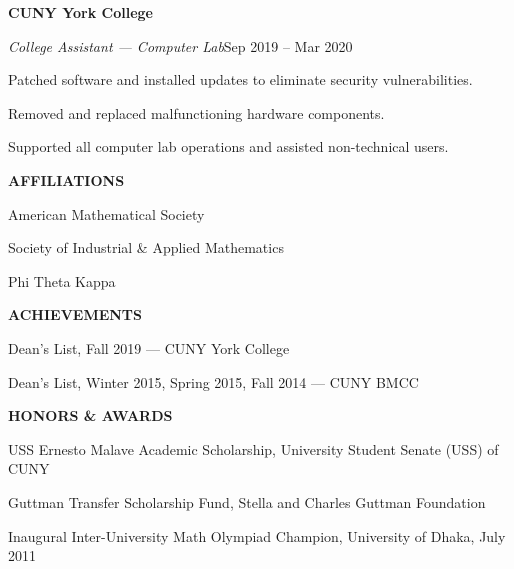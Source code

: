 \documentclass[a4paper, 12pt]{article}
\newcommand{\workplace}[1]{%
  \noindent\textbf{#1}\par
}
\newcommand{\workrole}[2]{%
  \noindent\hspace*{1em}\textit{#1}\hfill #2\par
}
\newcommand{\workunit}[1]{%
  \noindent\hspace*{1em}{\small\itshape #1}\par
}
\begin{document}
\begin{flushleft}
\noindent\begin{minipage}{\linewidth}
\workplace{CUNY York College}
\workrole{College Assistant --- Computer Lab}{Sep 2019 -- Mar 2020}
\workunit{Department of Mathematics \& Computer Science}
\begin{compactitem}
    \item Patched software and installed updates to eliminate security vulnerabilities.
    \item Removed and replaced malfunctioning hardware components.
    \item Supported all computer lab operations and assisted non-technical users.
\end{compactitem}
\end{minipage}

\end{flushleft}

\noindent\begin{minipage}{\linewidth}
\begin{flushleft}
\faUser\quad\textbf{AFFILIATIONS}
\begin{compactitem}
    \item American Mathematical Society
    \item Society of Industrial \& Applied Mathematics
    \item Phi Theta Kappa
\end{compactitem}
\end{flushleft}
\end{minipage}

\begin{flushleft}
\faTrophy\quad\textbf{ACHIEVEMENTS}
\begin{compactitem}
    \item Dean's List, Fall 2019 --- CUNY York College
    \item Dean's List, Winter 2015, Spring 2015, Fall 2014 --- CUNY BMCC
\end{compactitem}
\end{flushleft}

\noindent\begin{minipage}{\linewidth}
\begin{flushleft}
\faAward\quad\textbf{HONORS \& AWARDS}
\begin{compactitem}
    \item USS Ernesto Malave Academic Scholarship, University Student Senate (USS) of CUNY
    \item Guttman Transfer Scholarship Fund, Stella and Charles Guttman Foundation
    \item Inaugural Inter-University Math Olympiad Champion, University of Dhaka, July 2011
\end{compactitem}
\end{flushleft}
\end{minipage}
\end{document}
